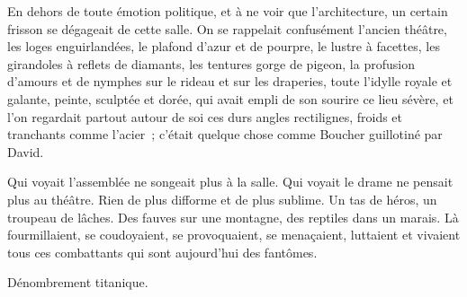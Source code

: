 \documentclass[french,twoside]{book} %
\def\mednobreak{\ifdim\lastskip<\medskipamount
  \removelastskip\nopagebreak\medskip\fi}
\newcommand{\labelblock}[1]{\medbreak{\noindent\color{rubric}\bfseries #1}\par\mednobreak}
\begin{document}
En dehors de toute émotion politique, et à ne voir que l’architecture, un certain frisson se dégageait de cette salle. On se rappelait confusément l’ancien théâtre, les loges enguirlandées, le plafond d’azur et de pourpre, le lustre à facettes, les girandoles à reflets de diamants, les tentures gorge de pigeon, la profusion d’amours et de nymphes sur le rideau et sur les draperies, toute l’idylle royale et galante, peinte, sculptée et dorée, qui avait empli de son sourire ce lieu sévère, et l’on regardait partout autour de soi ces durs angles rectilignes, froids et tranchants  comme l’acier ; c’était quelque chose comme Boucher guillotiné par David.\par

\labelblock{iv}

\noindent Qui voyait l’assemblée ne songeait plus à la salle. Qui voyait le drame ne pensait plus au théâtre. Rien de plus difforme et de plus sublime. Un tas de héros, un troupeau de lâches. Des fauves sur une montagne, des reptiles dans un marais. Là fourmillaient, se coudoyaient, se provoquaient, se menaçaient, luttaient et vivaient tous ces combattants qui sont aujourd’hui des fantômes.\par
Dénombrement titanique.\par
\end{document}
